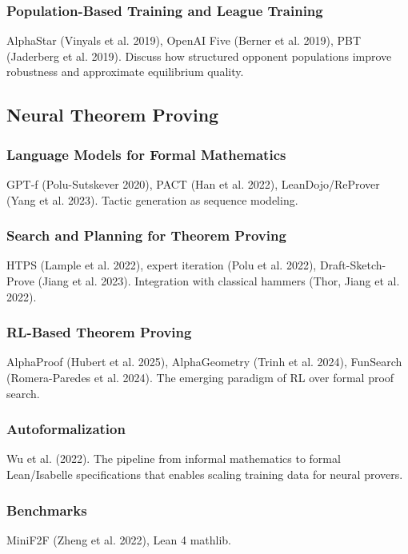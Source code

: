 \subsubsection{Population-Based Training and League Training}
AlphaStar (Vinyals et al. 2019), OpenAI Five (Berner et al. 2019), PBT (Jaderberg et al. 2019). Discuss how structured opponent populations improve robustness and approximate equilibrium quality.

\subsection{Neural Theorem Proving}
\subsubsection{Language Models for Formal Mathematics}
GPT-f (Polu-Sutskever 2020), PACT (Han et al. 2022), LeanDojo/ReProver (Yang et al. 2023). Tactic generation as sequence modeling.

\subsubsection{Search and Planning for Theorem Proving}
HTPS (Lample et al. 2022), expert iteration (Polu et al. 2022), Draft-Sketch-Prove (Jiang et al. 2023). Integration with classical hammers (Thor, Jiang et al. 2022).

\subsubsection{RL-Based Theorem Proving}
AlphaProof (Hubert et al. 2025), AlphaGeometry (Trinh et al. 2024), FunSearch (Romera-Paredes et al. 2024). The emerging paradigm of RL over formal proof search.

\subsubsection{Autoformalization}
Wu et al. (2022). The pipeline from informal mathematics to formal Lean/Isabelle specifications that enables scaling training data for neural provers.

\subsubsection{Benchmarks}
MiniF2F (Zheng et al. 2022), Lean 4 mathlib.
